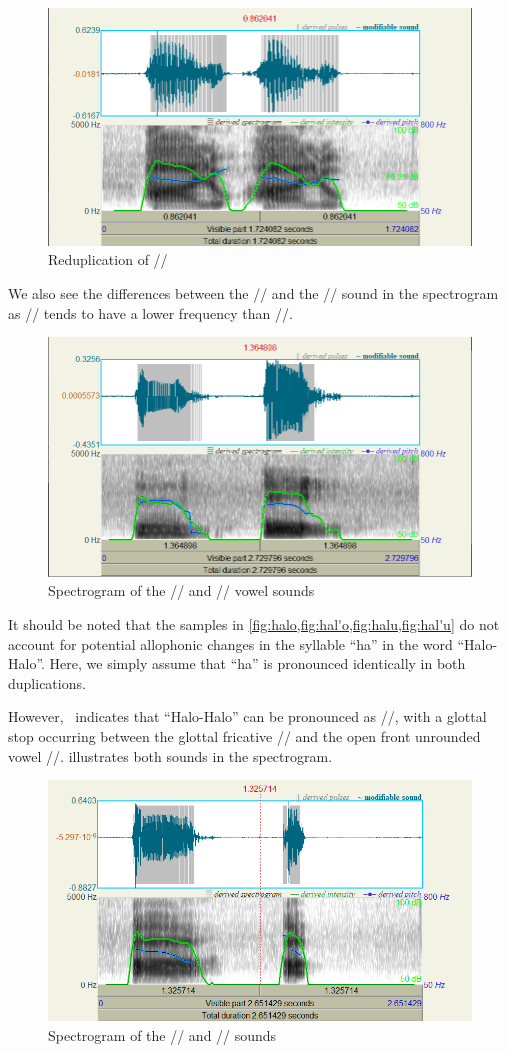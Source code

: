\documentclass{article}
\begin{document}
\begin{figure}
    \centering
    \includegraphics[width=0.65\linewidth]{img/hal_u.png}
    \caption{Reduplication of //}\label{fig:hal'u}
\end{figure}

We also see the differences between the // and the //
sound in the spectrogram as // tends to have a lower frequency than
//.

\begin{figure}
    \centering
    \includegraphics[width=0.65\linewidth]{img/u-o.png}
    \caption{Spectrogram of the // and // vowel sounds}\label{fig:u-o}
\end{figure}

It should be noted that the samples in
\cref{fig:halo,fig:hal'o,fig:halu,fig:hal'u} do not account for potential
allophonic changes in the syllable ``ha'' in the word ``Halo-Halo''. Here, we
simply assume that ``ha'' is pronounced identically in both duplications.

However,~\cite{KWF2015} indicates that ``Halo-Halo'' can be pronounced as
//, with a glottal stop occurring between the glottal
fricative // and the open front unrounded vowel //.
 illustrates both sounds in the spectrogram.

\begin{figure}
    \centering
    \includegraphics[width=0.65\linewidth]{img/a-a_.png}
    \caption{Spectrogram of the // and // sounds}\label{fig:a-a'}
\end{figure}
\end{document}
